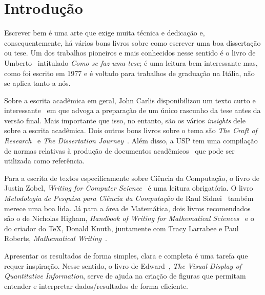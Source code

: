 \chapter{Introdução}
\label{cap:introducao}

Escrever bem é uma arte que exige muita técnica e dedicação e,
consequentemente, há vários bons livros sobre como escrever uma boa
dissertação ou tese. Um dos trabalhos pioneiros e mais conhecidos nesse
sentido é o livro de
Umberto~\citet{eco:09} %
intitulado \emph{Como se faz uma tese}; é uma leitura bem interessante mas,
como foi escrito em 1977 e é voltado para trabalhos de graduação na Itália,
não se aplica tanto a nós.

Sobre a escrita acadêmica em geral, John Carlis disponibilizou um texto curto
e interessante~\citep{carlis:09} em que advoga a preparação de um único
rascunho da tese antes da versão final. Mais importante que isso, no
entanto, são os vários \textit{insights} dele sobre a escrita acadêmica.
Dois outros bons livros sobre o tema são \emph{The Craft of Research}~\citep{craftresearch}
e \emph{The Dissertation Journey}~\citep{dissertjourney}. Além disso, a USP
tem uma compilação de normas relativas à produção de documentos
acadêmicos~\citep{usp:guidelines} que pode ser utilizada como referência.

Para a escrita de textos especificamente sobre Ciência da Computação, o
livro de Justin Zobel, \emph{Writing for Computer Science}~\citep{zobel:04}
é uma leitura obrigatória. O livro \emph{Metodologia de Pesquisa para
Ciência da Computação} de
Raul Sidnei~\citet{waz:09} %
também merece uma boa lida. Já para a área de Matemática, dois livros
recomendados são o de Nicholas Higham, \emph{Handbook of Writing for
Mathematical Sciences}~\citep{Higham:98} e o do criador do \TeX{}, Donald
Knuth, juntamente com Tracy Larrabee e Paul Roberts, \emph{Mathematical
Writing}~\citep{Knuth:96}.

Apresentar os resultados de forma simples, clara e completa é uma tarefa que
requer inspiração. Nesse sentido, o livro de
Edward~\citet{tufte01:visualDisplay}, %
\emph{The Visual Display of Quantitative Information}, serve de ajuda na
criação de figuras que permitam entender e interpretar dados/resultados de forma
eficiente.

